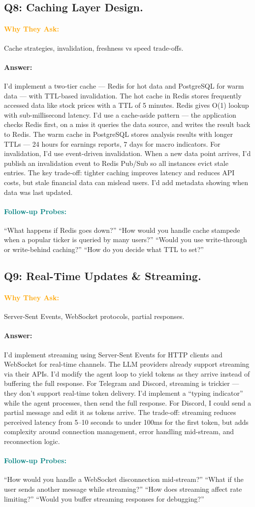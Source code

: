 \documentclass[11pt,a4paper]{article}
\newcommand{\Q}[1]{\subsection{#1}}
\newcommand{\Ans}[1]{\paragraph{\textbf{Answer:}} #1}
\newcommand{\Why}{\paragraph{\textcolor{orange}{\textbf{Why They Ask:}}}}
\newcommand{\Probe}{\paragraph{\textcolor{teal}{\textbf{Follow-up Probes:}}}}
\begin{document}
\Q{Q8: Caching Layer Design.}
\Why Cache strategies, invalidation, freshness vs speed trade-offs.
\Ans I'd implement a two-tier cache --- Redis for hot data and PostgreSQL for warm data --- with TTL-based invalidation. The hot cache in Redis stores frequently accessed data like stock prices with a TTL of 5 minutes. Redis gives O(1) lookup with sub-millisecond latency. I'd use a cache-aside pattern --- the application checks Redis first, on a miss it queries the data source, and writes the result back to Redis. The warm cache in PostgreSQL stores analysis results with longer TTLs --- 24 hours for earnings reports, 7 days for macro indicators. For invalidation, I'd use event-driven invalidation. When a new data point arrives, I'd publish an invalidation event to Redis Pub/Sub so all instances evict stale entries. The key trade-off: tighter caching improves latency and reduces API costs, but stale financial data can mislead users. I'd add metadata showing when data was last updated.
\Probe ``What happens if Redis goes down?'' ``How would you handle cache stampede when a popular ticker is queried by many users?'' ``Would you use write-through or write-behind caching?'' ``How do you decide what TTL to set?''

\Q{Q9: Real-Time Updates \& Streaming.}
\Why Server-Sent Events, WebSocket protocols, partial responses.
\Ans I'd implement streaming using Server-Sent Events for HTTP clients and WebSocket for real-time channels. The LLM providers already support streaming via their APIs. I'd modify the agent loop to yield tokens as they arrive instead of buffering the full response. For Telegram and Discord, streaming is trickier --- they don't support real-time token delivery. I'd implement a ``typing indicator'' while the agent processes, then send the full response. For Discord, I could send a partial message and edit it as tokens arrive. The trade-off: streaming reduces perceived latency from 5--10 seconds to under 100ms for the first token, but adds complexity around connection management, error handling mid-stream, and reconnection logic.
\Probe ``How would you handle a WebSocket disconnection mid-stream?'' ``What if the user sends another message while streaming?'' ``How does streaming affect rate limiting?'' ``Would you buffer streaming responses for debugging?''
\end{document}
